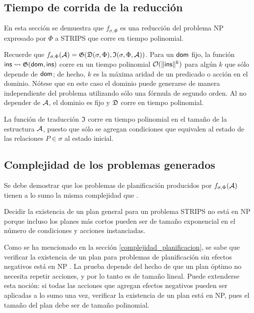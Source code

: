 \subsection{Tiempo de corrida de la reducción}
En esta sección se demuestra que $f_{\sigma,\Phi}$ es una reducción
del problema NP expresado por $\Phi$ a STRIPS que corre en tiempo polinomial.

Recuerde que 
$ f_{\sigma,\Phi}(\mathcal{A}) = \mathfrak{G}(\mathfrak{D}(\sigma,\Phi),\mathfrak{I}(\sigma,\Phi,\mathcal{A}))
$.
Para un $\mathsf{dom}$ fijo, la función
$\mathsf{ins}\leadsto\mathfrak{G}(\mathsf{dom}, \mathsf{ins})$ corre en un tiempo polinomial
$\mathcal{O}(\|\mathsf{ins}\|^k)$ para algún $k$ que sólo depende de $\mathsf{dom}$; de hecho,
$k$ es la máxima aridad de un predicado o acción en el dominio. Nótese que en
este caso el dominio puede generarse de manera independiente del problema 
utilizando sólo una fórmula de segundo orden. Al no depender de $\mathcal{A}$, el
dominio es fijo y $\mathfrak{D}$ corre en tiempo polinomial.

La función de traducción $\mathfrak{I}$ corre en tiempo
polinomial en el tamaño de la estructura $\mathcal{A}$, puesto que sólo se agregan
condiciones que equivalen al estado de las relaciones $P\in\sigma$ al estado inicial.


\subsection{Complejidad de los problemas generados}
Se debe demostrar que los problemas de planificación producidos 
por $f_{\sigma,\Phi}(\mathcal{A})$ tienen a lo sumo la misma
complejidad que \SOE.

Decidir la existencia de un plan general para un problema
STRIPS no está en NP porque incluso los planes más cortos pueden
ser de tamaño exponencial en el número de condiciones y acciones instanciadas.

Como se ha mencionado en la sección \ref{complejidad_planificacion}, 
se sabe que verificar la existencia de un plan para 
problemas de planificación
sin efectos negativos está en NP \citep{bylander:plan-complexity}. La prueba
depende del hecho de que un plan óptimo no necesita repetir acciones, y por lo
tanto es de tamaño lineal. Puede extenderse esta noción: si todas las acciones que
agregan efectos negativos pueden ser aplicadas a lo sumo una vez, verificar la
existencia de un plan está en NP, pues el tamaño del plan debe ser de tamaño
polinomial.

